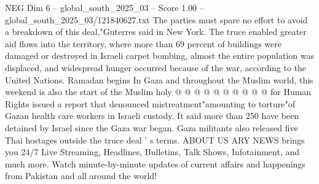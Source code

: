 \begin{textsample}{NEG Dim 6 – global\_south\_2025\_03 – Score 1.00 – global\_south\_2025\_03/121840627.txt}
The parties must spare no effort to avoid a breakdown of this deal,"Guterres said in New York.
The truce enabled greater aid flows into the territory, where more than 69 percent of buildings were damaged or destroyed in Israeli carpet bombing, almost the entire population was displaced, and widespread hunger occurred because of the war, according to the United Nations.
Ramadan begins In Gaza and throughout the Muslim world, this weekend is also the start of the Muslim holy @ @ @ @ @ @ @ @ @ @ for Human Rights issued a report that denounced mistreatment"amounting to torture"of Gazan health care workers in Israeli custody.
It said more than 250 have been detained by Israel since the Gaza war began.
Gaza militants also released five Thai hostages outside the truce deal ' s terms.
ABOUT US ARY NEWS brings you 24/7 Live Streaming, Headlines, Bulletins, Talk Shows, Infotainment, and much more.
Watch minute-by-minute updates of current affairs and happenings from Pakistan and all around the world!

\end{textsample}
